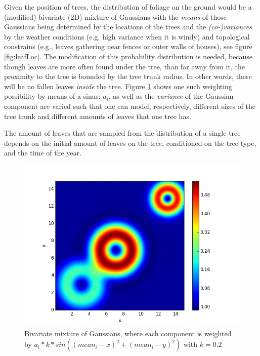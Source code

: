 \documentclass[fleqn,10pt]{SelfArx} %
\begin{document}
Given the position of trees, the distribution of foliage on the ground would be a (modified) bivariate (2D) mixture of Gaussians with the \emph{means} of those Gaussians being determined by the locations of the trees and the \emph{(co-)variances} by the weather conditions (e.g. high variance when it is windy) and topological constrains (e.g., leaves gathering near fences or outer walls of houses), see figure \ref{fig:leafLoc}. The modification of this probability distribution is needed, because though leaves are more often found under the tree, than far away from it, the proximity to the tree is bounded by the tree trunk radius. In other words, there will be no fallen leaves \emph{inside} the tree. Figure \ref{fig:gausMixSinus} shows one such weighting possibility by means of a sinus: $a_{i}$, as well as the \emph{variance} of the Gaussian component are varied such that one can model, respectively, different sizes of the tree trunk and different amounts of leaves that one tree has.

The amount of leaves that are sampled from the distribution of a single tree depends on the initial amount of leaves on the tree, conditioned on the tree type, and the time of the year.

\begin{figure}[ht]\centering
\includegraphics[width=\linewidth]{Figures/gausMixSinus.png}
\caption{Bivariate mixture of Gaussians, where each component is weighted by $a_{i}*k*sin((mean_{i}-x)^{2}+(mean_{i}-y)^{2})$ with $k=0.2$}
\label{fig:gausMixSinus}
\end{figure}
\end{document}
